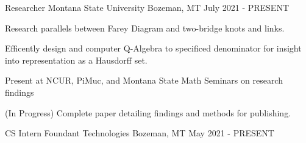 
\begin{cventries}
  \cventry
    {Researcher} %
    {Montana State University} %
    {Bozeman, MT} %
    {July 2021 - PRESENT} %
    {
      \begin{cvitems} %
        \item {Research parallels between Farey Diagram and two-bridge knots and links.}
        \item {Efficently design and computer Q-Algebra to specificed denominator for insight into representation as a Hausdorff set.}
        \item {Present at NCUR, PiMuc, and Montana State Math Seminars on research findings}
        \item {(In Progress) Complete paper detailing findings and methods for publishing.}
      \end{cvitems}
    }
  \cventry
      {CS Intern}
      {Foundant Technologies}
      {Bozeman, MT}
      {May 2021 - PRESENT}
      {
        \begin{cvitems}
          \item {}
        \end{cvitems}  
      }

  
    
\end{cventries}
